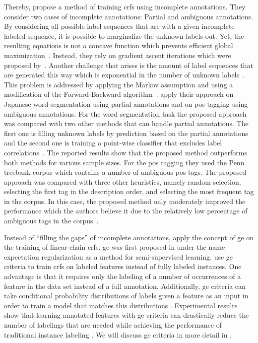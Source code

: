 Thereby, \citet{tsuboi2008training} propose a method of training \glspl{crf} using incomplete annotations.
They consider two cases of incomplete annotations: Partial and ambiguous annotations.
By considering all possible label sequences that are with a given incomplete labeled sequence, it is possible to marginalize the unknown labels out.
Yet, the resulting equations is not a concave function which prevents efficient global maximization~\citep{tsuboi2008training}.
Instead, they rely on gradient ascent iterations which were proposed by~\citep{sha2003shallow}.
Another challenge that arises is the amount of label sequences that are generated this way which is exponential in the number of unknown labels~\citep{tsuboi2008training}.
This problem is addressed by applying the Markov assumption and using a modification of the Forward-Backward algorithm~\citep{tsuboi2008training}.
\citet{tsuboi2008training} apply their approach on Japanese word segmentation using partial annotations and on \gls{pos} tagging using ambiguous annotations.
For the word segmentation task the proposed approach was compared with two other methods that can handle partial annotations.
The first one is filling unknown labels by prediction based on the partial annotations and the second one is training a point-wise classifier that excludes label correlations~\citep{tsuboi2008training}.
The reported results show that the proposed method outperforms both methods for various sample sizes.
For the \gls{pos} tagging they used the Penn treebank corpus \citep{marcus1993building} which contains a number of ambiguous \gls{pos} tags.
The proposed approach was compared with three other heuristics, namely random selection, selecting the first tag in the description order, and selecting the most frequent tag in the corpus.
In this case, the proposed method only moderately improved the performance which the authors believe it due to the relatively low percentage of ambiguous tags in the corpus~\citep{tsuboi2008training}.

Instead of ``filling the gaps'' of incomplete annotations, \citet{mann2008generalized} apply the concept of \gls{ge} on the training of linear-chain \glspl{crf}.
\Gls{ge} was first proposed in \citet{mann2007simple} under the name \gls{expectation regularization} as a method for semi-supervised learning.
\citet{mann2008generalized} use \gls{ge} criteria to train \glspl{crf} on labeled features instead of fully labeled instances.
One advantage is that it requires only the labeling of a number of occurrences of a feature in the data set instead of a full annotation.
Additionally, \gls{ge} criteria can take \glspl{conditional probability distribution} of labels given a feature as an input in order to train a model that matches this distributions \citep{mann2008generalized}.
Experimental results show that learning annotated features with \gls{ge} criteria can drastically reduce the number of labelings that are needed while achieving the performance of traditional instance labeling \citep{mann2008generalized}.
We will discuss \gls{ge} criteria in more detail in .

